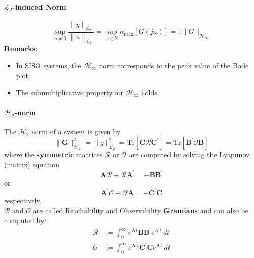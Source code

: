 \paragraph[L2-induced Norm]{$\mathcal{L}_2$-induced Norm}
\noindent\begin{equation*}
    \sup_{u\neq0}\frac{\|y\|_{\mathcal{L}_2}}{\|u\|_{\mathcal{L}_2}}=\sup_{\omega\in\mathbb{R}}\sigma_{\max}[G(j\omega)]=:\|G\|_{\mathcal{H}_\infty}
\end{equation*}
\textbf{Remarks}:
\begin{itemize}
    \item In SISO systems, the $\mathcal{H}_\infty$ norm corresponds to the peak value of the Bode plot.
    \item The submultiplicative property for $\mathcal{H}_\infty$ holds.
\end{itemize}

\paragraph[H2-induced Norm]{$\mathcal{H}_2$-norm}

The $\mathcal{H}_2$ norm of a system is given by
\begin{equation*}
    \|\mathbf{G}\|_{\mathcal{H}_2}^2=\|g\|_{\mathcal{L}_2}^2=\mathrm{Tr}\left[\mathbf{C\mathcal{R}C}^{\prime}\right]=\mathrm{Tr}\left[\mathbf{B^{\prime}\mathcal{O}B}\right]
\end{equation*}
where the \textbf{symmetric} matrices $\mathbf{\mathcal{R}}$ or $\mathbf{\mathcal{O}}$ are computed by solving the Lyapunov (matrix) equation
\begin{equation*}
    \mathbf{ A\mathcal{R}}+\mathbf{\mathcal{R}A}^{\prime}=-\mathbf{BB}^{\prime}
\end{equation*}
or\begin{equation*}
    \mathbf{A^{\prime}\mathcal{O}}+\mathbf{\mathcal{O}A}=-\mathbf{C^{\prime}C}
\end{equation*}
respectively.\\
$\mathbf{\mathcal{R}}$ and $\mathbf{\mathcal{O}}$ are called Reachability and Observability \textbf{Gramians} and can also be computed by:
\begin{align*}
    \mathbf{\mathcal{R}} & :=\int_{0}^{\infty}e^{\mathbf{A}t}\mathbf{BB}^{\prime}e^{A^{\prime}t}\mathrm{~}dt          \\
    \mathbf{\mathcal{O}} & :=\int_{0}^{\infty}e^{\mathbf{A}^{\prime}t}\mathbf{C^{\prime}C}e^{\mathbf{A}t}\mathrm{~}dt
\end{align*}

